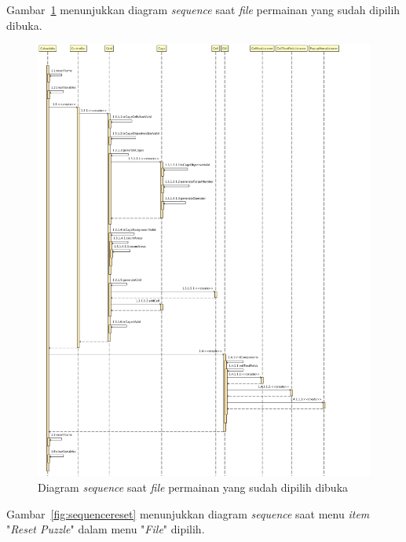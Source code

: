 Gambar~\ref{fig:sequenceloadpuzzlefile} menunjukkan diagram \textit{sequence} saat \textit{file} permainan yang sudah dipilih dibuka.

\begin{figure}
\centering
\captionsetup{justification=centering}
\includegraphics[scale=0.4]{Gambar/Analisis/SequenceDiagramLoadPuzzleFile.png}
\caption[Diagram \textit{sequence} saat \textit{file} permainan yang sudah dipilih dibuka]{Diagram \textit{sequence} saat \textit{file} permainan yang sudah dipilih dibuka}
\label{fig:sequenceloadpuzzlefile}
\end{figure}

Gambar~\ref{fig:sequencereset} menunjukkan diagram \textit{sequence} saat menu \textit{item} "\textit{Reset Puzzle}" dalam menu "\textit{File}" dipilih.

